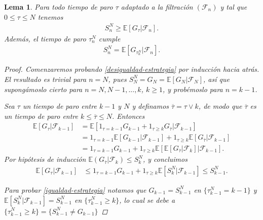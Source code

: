 \documentclass{article}
\newtheorem{lema}[theorem]{Lema}
\numberwithin{equation}{section}
\begin{document}
\begin{lema}\label{lema1}
    Para todo tiempo de paro $\tau$ adaptado a la filtración $(\mathcal{F}_n)$ y tal que $0\leq \tau \leq N$ tenemos
    \begin{align}\label{desigualdad-estrategia}
        S_n^N \geq \mathbb{E}\left[G_\tau|\mathcal{F}_n\right].
    \end{align}
    Además, el tiempo de paro $\tau_n^N$ cumple
    \begin{align}\label{igualdad-estrategia}
        S_n^N = \mathbb{E}\left[G_{\tau_n^N}|\mathcal{F}_n\right].
    \end{align}
    
\begin{proof}
    Comenzaremos probando \eqref{desigualdad-estrategia} por inducción hacia atrás. El resultado es trivial para $n = N$, pues $S_N^N = G_N = \mathbb{E}\left[G_N | \mathcal{F}_N\right]$, así que supongámoslo cierto para $n = N,N-1,...,k$, $k\geq 1$, y probémoslo para $n = k-1$.

    Sea $\tau$ un tiempo de paro entre $k-1$ y $N$ y definamos $\overline{\tau} = \tau \lor k$, de modo que $\overline{\tau}$ es un tiempo de paro entre $k\leq \overline{\tau}\leq N$. Entonces
    \begin{align*}
        \mathbb{E}\left[G_\tau | \mathcal{F}_{k-1}\right] &= \mathbb{E}\left[1_{\tau = k-1}G_{k-1} + 1_{\tau\geq k}G_{\overline{\tau}} | \mathcal{F}_{k-1} \right]\\
        &= 1_{\tau = k-1}\mathbb{E}\left[G_{k-1} | \mathcal{F}_{k-1}\right] + 1_{\tau\geq k}\mathbb{E}\left[G_{\overline{\tau}} | \mathcal{F}_{k-1} \right]\\
        &= 1_{\tau = k-1}G_{k-1} + 1_{\tau\geq k}\mathbb{E}\left[\mathbb{E}\left[G_{\overline{\tau}} | \mathcal{F}_{k} \right] | \mathcal{F}_{k-1}  \right].
    \end{align*}
    Por hipótesis  de inducción $\mathbb{E}(G_{\overline{\tau}} | \mathcal{F}_k) \leq S^N_{k}$, y
    concluimos
    \begin{align*}
        \mathbb{E}\left[G_\tau | \mathcal{F}_{k-1}\right] &\leq 1_{\tau = k-1}G_{k-1} + 1_{\tau\geq k}\mathbb{E}\left[S_k^N | \mathcal{F}_{k-1} \right] 
        \leq S_{k-1}^N.
    \end{align*}

Para probar \eqref{igualdad-estrategia} notamos que $G_{k-1} = S^N_{k-1}$ en $\{\tau^N_{k-1} = k-1\}$ y $\mathbb{E}\left[S_k^N | \mathcal{F}_{k-1}\right] = S^N_{k-1}$ en $\{\tau^N_{k-1} \geq k\}$, lo cual se debe a  $\{\tau_{k-1}^N \geq k\} = \{S_{k-1}^N \not = G_{k-1} \}$


\end{proof}
\end{lema}
\end{document}

